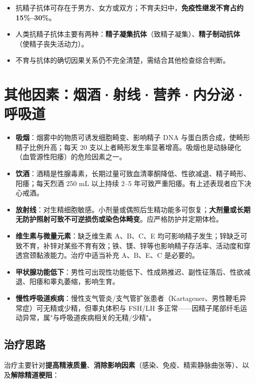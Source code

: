 \documentclass[12pt,UTF8,openany]{ctexbook}
\begin{document}
\begin{itemize}[leftmargin=2em,itemsep=0.3em]
  \item 抗精子抗体可存在于男方、女方或双方；不育夫妇中，\textbf{免疫性继发不育占约 15\%–30\%}。
  \item 人类抗精子抗体主要有两种：\textbf{精子凝集抗体}（致精子凝集）、\textbf{精子制动抗体}（使精子丧失活动力）。
  \item 不育与抗体的确切因果关系仍不完全清楚，需结合其他检查综合判断。
\end{itemize}

\section{其他因素：烟酒·射线·营养·内分泌·呼吸道}

\begin{itemize}[leftmargin=2em,itemsep=0.3em]
  \item \textbf{吸烟}：烟雾中的物质可诱发细胞畸变、影响精子 DNA 与蛋白质合成，使畸形精子比例升高；每天 20 支以上者畸形发生率显著增高。吸烟也是动脉硬化（血管源性阳痿）的危险因素之一。
  \item \textbf{饮酒}：酒精是性腺毒素，长期过量可致血清睾酮降低、性欲减退、精子畸形、阳痿；每天烈酒 250 mL 以上持续 2–5 年可致严重阳痿。有上述表现者应下决心戒酒。
  \item \textbf{放射线}：对生精细胞敏感。小剂量或偶照后生精功能多可恢复；\textbf{大剂量或长期无防护照射可致不可逆损伤或染色体畸变}。应严格防护并定期体检。
  \item \textbf{维生素与微量元素}：缺乏维生素 A、B、C、E 均可影响精子发生；锌缺乏可致不育，补锌对某些不育有效；铁、镁、锌等也影响精子存活率、活动度和穿透宫颈黏液能力。治疗中适当补充 A、B、E、C 是必要的。
  \item \textbf{甲状腺功能低下}：男性可出现性功能低下、性成熟推迟、副性征落后、性欲减退、阳痿和睾丸萎缩，影响生育。
  \item \textbf{慢性呼吸道疾病}：慢性支气管炎/支气管扩张患者（Kartagener、男性鞭毛异常症）可无精或少精，但睾丸体积与 FSH/LH 多正常——因精子尾部纤毛运动异常，属"与呼吸道疾病相关的无精/少精"。
\end{itemize}

\subsection*{治疗思路}

治疗主要针对\textbf{提高精液质量}、\textbf{消除影响因素}（感染、免疫、精索静脉曲张等）、以及\textbf{解除精道梗阻}：
\end{document}
